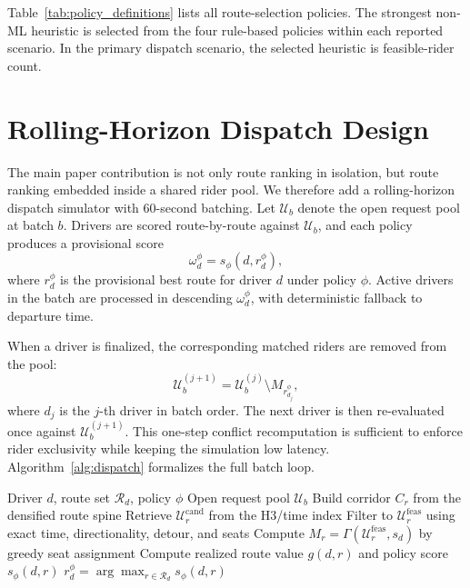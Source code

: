 \documentclass[journal]{IEEEtran}
\begin{document}
Table~\ref{tab:policy_definitions} lists all route-selection policies. The strongest non-ML heuristic is selected from the four rule-based policies within each reported scenario. In the primary dispatch scenario, the selected heuristic is feasible-rider count.

\section{Rolling-Horizon Dispatch Design}
The main paper contribution is not only route ranking in isolation, but route ranking embedded inside a shared rider pool. We therefore add a rolling-horizon dispatch simulator with 60-second batching. Let \(\mathcal{U}_b\) denote the open request pool at batch \(b\). Drivers are scored route-by-route against \(\mathcal{U}_b\), and each policy produces a provisional score
\[
\omega_d^\phi=s_\phi\!\left(d,r_d^\phi\right),
\]
where \(r_d^\phi\) is the provisional best route for driver \(d\) under policy \(\phi\). Active drivers in the batch are processed in descending \(\omega_d^\phi\), with deterministic fallback to departure time.

When a driver is finalized, the corresponding matched riders are removed from the pool:
\[
\mathcal{U}_b^{(j+1)}=\mathcal{U}_b^{(j)}\setminus M_{r_{d_j}^{\phi}},
\]
where \(d_j\) is the \(j\)-th driver in batch order. The next driver is then re-evaluated once against \(\mathcal{U}_b^{(j+1)}\). This one-step conflict recomputation is sufficient to enforce rider exclusivity while keeping the simulation low latency. Algorithm~\ref{alg:dispatch} formalizes the full batch loop.

\begin{algorithm}[!t]
\caption{Route-aware retrieval and scoring for one driver}
\label{alg:route_scoring}
\footnotesize
\begin{algorithmic}[1]
\Require Driver \(d\), route set \(\mathcal{R}_d\), policy \(\phi\)
\Statex \hspace{\algorithmicindent} Open request pool \(\mathcal{U}_b\)
    \State Build corridor \(C_r\) from the densified route spine
    \State Retrieve \(\mathcal{U}_r^{\mathrm{cand}}\) from the H3/time index
    \State Filter to \(\mathcal{U}_r^{\mathrm{feas}}\) using
    \Statex \hspace{\algorithmicindent} exact time, directionality, detour, and seats
    \State Compute \(M_r=\Gamma(\mathcal{U}_r^{\mathrm{feas}},s_d)\) by greedy seat assignment
    \State Compute realized route value \(g(d,r)\) and policy score \(s_\phi(d,r)\)
\EndFor
\State \Return \(r_d^\phi=\arg\max_{r \in \mathcal{R}_d}s_\phi(d,r)\)
\end{algorithmic}
\end{algorithm}
\end{document}
